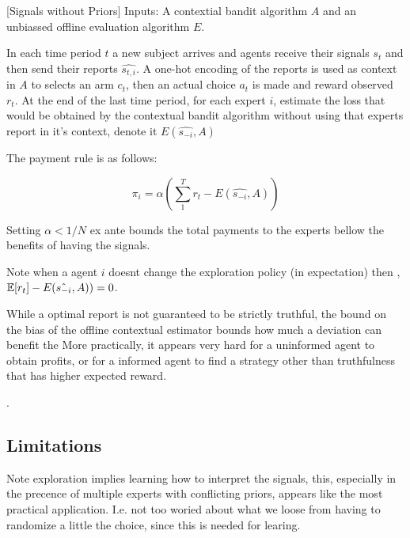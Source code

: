 \begin{mech}\label{mech:bandit}[Signals without Priors]
Inputs: A contextial bandit algorithm $A$ and an unbiassed offline evaluation algorithm $E$.

In each time period $t$ a new subject arrives and agents receive their signals $s_t$ and then send their reports $\hat{s_{t,i}}$. A one-hot encoding of the reports is used as context in $A$ to selects an arm $c_t$, then an actual choice $a_t$ is made and reward observed $r_t$.
At the end of the last time period, for each expert $i$, estimate the loss that would be obtained by the contextual bandit algorithm without using that experts report in it's context, denote it $E(\hat{s_{-i}},A)$
 
The payment rule is as follows:

\[
    \pi_i =  \alpha (\sum_1^T r_t -  E(\hat{s_{-i}},A))
\]

Setting $\alpha<1/N$ ex ante bounds the total payments to the experts bellow the benefits of having the signals.

\end{mech}


Note when a agent $i$ doesnt change the exploration policy (in expectation) then , $ \operatorname*{\mathbb E}[r_t] -  E(\hat{s_{-i}},A)) =0  $.

While a optimal report is not guaranteed to be strictly truthful, the bound on the bias of the offline contextual estimator bounds how much a deviation can benefit the 
More practically, it appears very hard for a uninformed agent to obtain profits, or for a informed agent to find a strategy other than truthfulness that has higher expected reward.

.




\subsection{Limitations}


Note exploration implies learning how to interpret the signals, this, especially in the precence of multiple experts with conflicting priors, appears like the most practical application. I.e. not too woried about what we loose from having to randomize a little the choice, since this is needed for learing. 


